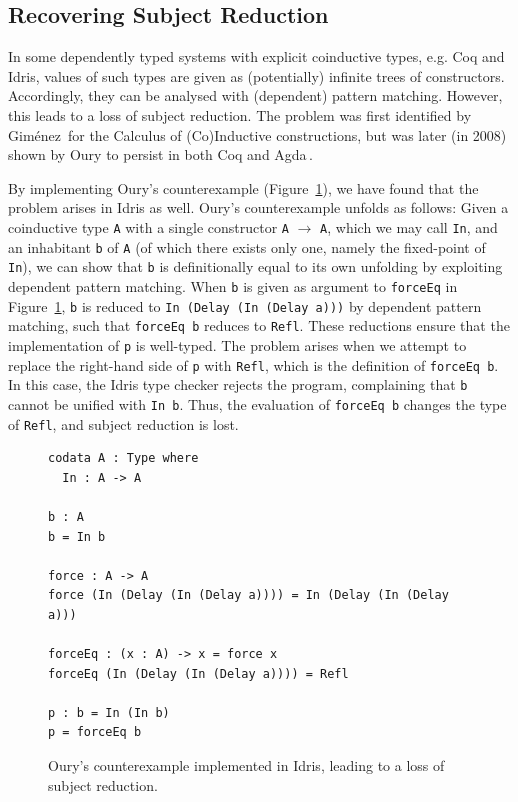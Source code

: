 \subsection{Recovering Subject Reduction}
\label{sec:recov-subj-reduct}

In some dependently typed systems with explicit coinductive types, e.g. Coq and
Idris, values of such types are given as (potentially) infinite trees of
constructors. Accordingly, they can be analysed with (dependent) pattern
matching. However, this leads to a loss of subject reduction. The problem was
first identified by Gim\'{e}nez\,\citep{Gimenez96uncalcul} for the Calculus of
(Co)Inductive constructions, but was later (in 2008) shown by Oury to persist in
both Coq and Agda\,\citep{OuryCounterexampleCoq,OuryCounterexampleAgda}.

By implementing Oury's counterexample
(Figure~\ref{fig:ourys_counterexample_idris}), we have found that the problem
arises in Idris as well. Oury's counterexample unfolds as follows: Given a
coinductive type \texttt{A} with a single constructor \texttt{A} $\to$ \texttt{A}, which we may call
\texttt{In}, and an inhabitant \texttt{b} of \texttt{A} (of which there exists only one,
namely the fixed-point of \texttt{In}), we can show that \texttt{b} is definitionally
equal to its own unfolding by exploiting dependent pattern matching. When
\texttt{b} is given as argument to \texttt{forceEq} in
Figure~\ref{fig:ourys_counterexample_idris}, \texttt{b} is reduced to \texttt{In
  (Delay (In (Delay a)))} by dependent pattern matching, such that \texttt{forceEq b}
reduces to \texttt{Refl}. These reductions ensure that the implementation of
\texttt{p} is well-typed. The problem arises when we attempt to replace the
right-hand side of \texttt{p} with \texttt{Refl}, which is the definition of
\texttt{forceEq b}. In this case, the Idris type checker rejects the program,
complaining that \texttt{b} cannot be unified with \texttt{In b}. Thus, the
evaluation of \texttt{forceEq b} changes the type of \texttt{Refl}, and subject
reduction is lost.

\begin{figure}
\begin{lstlisting}[mathescape]
codata A : Type where
  In : A -> A

b : A
b = In b

force : A -> A
force (In (Delay (In (Delay a)))) = In (Delay (In (Delay a)))

forceEq : (x : A) -> x = force x
forceEq (In (Delay (In (Delay a)))) = Refl

p : b = In (In b)
p = forceEq b
\end{lstlisting}
  \caption{Oury's counterexample implemented in Idris, leading to a loss of
    subject reduction.}
\label{fig:ourys_counterexample_idris}
\end{figure}

